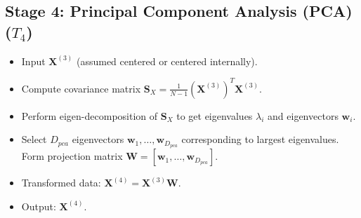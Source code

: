 \documentclass{article}
\newcommand{\mat}[1]{\mathbf{#1}} %
\newcommand{\vecbf}[1]{\bm{#1}} %
\begin{document}
\subsection*{Stage 4: Principal Component Analysis (PCA) ($T_4$)}
\begin{itemize}
    \item Input $\mat{X}^{(3)}$ (assumed centered or centered internally).
    \item Compute covariance matrix $\mat{S}_X = \frac{1}{N-1} (\mat{X}^{(3)})^T \mat{X}^{(3)}$.
    \item Perform eigen-decomposition of $\mat{S}_X$ to get eigenvalues $\lambda_i$ and eigenvectors $\vecbf{w}_i$.
    \item Select $D_{pca}$ eigenvectors $\vecbf{w}_1, \dots, \vecbf{w}_{D_{pca}}$ corresponding to largest eigenvalues. Form projection matrix $\mat{W} = [\vecbf{w}_1, \dots, \vecbf{w}_{D_{pca}}]$.
    \item Transformed data: $\mat{X}^{(4)} = \mat{X}^{(3)} \mat{W}$.
    \item Output: $\mat{X}^{(4)}$.
\end{itemize}
\end{document}
